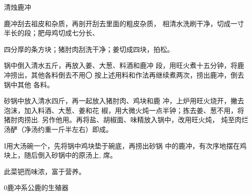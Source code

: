 \begin{recipe}{清烛鹿冲}

\ingredients



\cooking

\step 鹿冲刮去祖皮和杂质，再剖开刮去里面的粗皮杂质， 相清水洗刷干净，切成一寸半长的段；肥母鸡切成七分长、

四分厚的条方块；猪肘肉刮洗干净；姜切成四块，拍松。

\step 锅中倒入清水五斤，再放入姜、大葱、料酒和鹿冲 段，用旺火煮十五分钟，将鹿冲捞出，其他各料倒去不用〇 按上述用料和作法再继续煮两次，捞出鹿冲，倒去锅中其他 各料。

\step 砂锅中放入清水四斤，再一起放入猪肘肉、鸡块和鹿 冲，上炉用旺火烧开，撇去泡沫，加入料酒、大葱、姜和花 椒，用大微火炖一点半钟；拣去姜、葱不用，将猪肘肉捞出. 另作他用。再将盐、胡椒面、味精放入锅中，改用旺火炖， 炖至肉烂汤酽（净汤约重一斤半左右）即成。

I用大汤碗一个，先将锅中鸡块垫于碗底，再捞出砂锅 中的鹿冲，有次序地摆在鸡块上，随后倒入砂锅中的原汤上, 席。

\notes

此菜钯而味浓，富于营养。

0鹿冲系公鹿的生殖器

\end{recipe}

